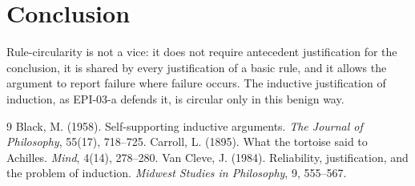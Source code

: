 \documentclass{situationist-preprint}
\begin{document}
\section{Conclusion}

Rule-circularity is not a vice: it does not require antecedent justification for the conclusion, it is shared by every justification of a basic rule, and it allows the argument to report failure where failure occurs. The inductive justification of induction, as EPI-03-a defends it, is circular only in this benign way.

\begin{thebibliography}{9}\small
{} Black, M. (1958). Self-supporting inductive arguments. \emph{The Journal of Philosophy}, 55(17), 718--725.
 Carroll, L. (1895). What the tortoise said to Achilles. \emph{Mind}, 4(14), 278--280.
 Van Cleve, J. (1984). Reliability, justification, and the problem of induction. \emph{Midwest Studies in Philosophy}, 9, 555--567.
\end{thebibliography}
\end{document}
